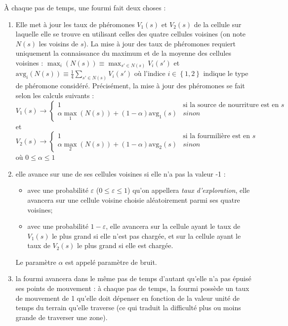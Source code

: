 \documentclass[a4]{article}
\newcommand{\avg}{\textrm{avg}}
\begin{document}
À chaque pas de temps, une fourmi fait deux choses :
\begin{enumerate}
\item Elle met à jour les taux de phéromones $V_{1}(s)$ et $V_{2}(s)$ de la cellule sur laquelle elle se trouve en utilisant celles des quatre cellules voisines (on note $N(s)$ les voisins de $s$).
  La mise à jour des taux de phéromones requiert uniquement la connaissance du maximum et de la moyenne des cellules voisines :
  $\max_{i}\left(N(s)\right) \equiv \max_{s'\in N(s)}V_{i}(s')$
  et $\avg_{i}\left(N(s)\right)\equiv\frac{1}{4} \sum_{s'\in N(s)} V_{i}(s')$
  où l'indice $i\in\left\{1,2\right\}$ indique le type de phéromone considéré.
  Précisément, la mise à jour des phéromones se fait selon les calculs suivants :
\[
V_{1}(s) \rightarrow \left\{\begin{array}{ll} 
 1 & \mbox{si la source de nourriture est en }s \\
 \alpha \max_{1}(N(s)) + (1-\alpha)\avg_{1}(s) & sinon
 \end{array}\right.
 \]
 et
\[
V_{2}(s) \rightarrow \left\{\begin{array}{ll} 
 1 & \mbox{si la fourmilière est en }s \\
 \alpha \max_{2}(N(s)) + (1-\alpha)\avg_{2}(s) & sinon
 \end{array}\right.
 \]
où $0\leq \alpha \leq 1$ 
\item elle avance sur une de ses cellules voisines si elle n'a pas la valeur -1 :
\begin{itemize}
\item avec une probabilité $\varepsilon$ ($0 \leq \varepsilon \leq 1$) qu'on appellera \textsl{taux d'exploration}, elle avancera sur une cellule voisine choisie aléatoirement parmi ses quatre voisines;
\item avec une probabilité $1-\varepsilon$, elle avancera sur la cellule ayant le taux de $V_{1}(s)$ le plus grand si elle n'est pas
chargée, et sur la cellule ayant le taux de $V_{2}(s)$ le plus grand si elle est chargée.
\end{itemize}
Le paramètre $\alpha$ est appelé paramètre de bruit.
  \item la fourmi avancera dans le même pas de temps d'autant qu'elle n'a pas épuisé ses points de mouvement : à chaque pas de temps, la
fourmi possède un taux de mouvement de 1 qu'elle doit dépenser en fonction de la valeur unité de temps du terrain qu'elle traverse (ce
qui traduit la difficulté plus ou moins grande de traverser une zone). 
\end{enumerate}
\end{document}

